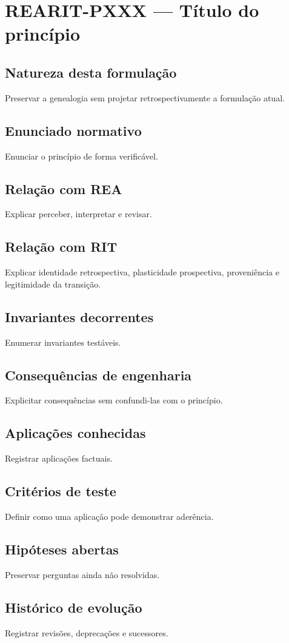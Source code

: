 %

\chapter{REARIT-PXXX --- Título do princípio}
\section{Natureza desta formulação}
Preservar a genealogia sem projetar retrospectivamente a formulação atual.
\section{Enunciado normativo}
Enunciar o princípio de forma verificável.
\section{Relação com REA}
Explicar perceber, interpretar e revisar.
\section{Relação com RIT}
Explicar identidade retrospectiva, plasticidade prospectiva, proveniência e
legitimidade da transição.
\section{Invariantes decorrentes}
Enumerar invariantes testáveis.
\section{Consequências de engenharia}
Explicitar consequências sem confundi-las com o princípio.
\section{Aplicações conhecidas}
Registrar aplicações factuais.
\section{Critérios de teste}
Definir como uma aplicação pode demonstrar aderência.
\section{Hipóteses abertas}
Preservar perguntas ainda não resolvidas.
\section{Histórico de evolução}
Registrar revisões, deprecações e sucessores.
